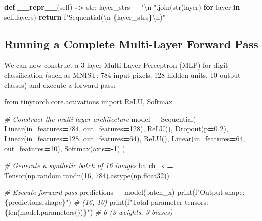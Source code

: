 \documentclass[
  letterpaper,
]{scrbook}
\newenvironment{Shaded}{\begin{snugshade}}{\end{snugshade}}
\newcommand{\BuiltInTok}[1]{#1}
\newcommand{\CharTok}[1]{\textcolor[rgb]{0.31,0.60,0.02}{#1}}
\newcommand{\CommentTok}[1]{\textcolor[rgb]{0.56,0.35,0.01}{\textit{#1}}}
\newcommand{\ControlFlowTok}[1]{\textcolor[rgb]{0.13,0.29,0.53}{\textbf{#1}}}
\newcommand{\DecValTok}[1]{\textcolor[rgb]{0.00,0.00,0.81}{#1}}
\newcommand{\FloatTok}[1]{\textcolor[rgb]{0.00,0.00,0.81}{#1}}
\newcommand{\FunctionTok}[1]{\textcolor[rgb]{0.13,0.29,0.53}{\textbf{#1}}}
\newcommand{\ImportTok}[1]{#1}
\newcommand{\KeywordTok}[1]{\textcolor[rgb]{0.13,0.29,0.53}{\textbf{#1}}}
\newcommand{\NormalTok}[1]{#1}
\newcommand{\OperatorTok}[1]{\textcolor[rgb]{0.81,0.36,0.00}{\textbf{#1}}}
\newcommand{\SpecialCharTok}[1]{\textcolor[rgb]{0.81,0.36,0.00}{\textbf{#1}}}
\newcommand{\SpecialStringTok}[1]{\textcolor[rgb]{0.31,0.60,0.02}{#1}}
\newcommand{\StringTok}[1]{\textcolor[rgb]{0.31,0.60,0.02}{#1}}
\newcommand{\VariableTok}[1]{\textcolor[rgb]{0.00,0.00,0.00}{#1}}
\begin{document}
\begin{Shaded}
\begin{Highlighting}[]
    \KeywordTok{def} \FunctionTok{\_\_repr\_\_}\NormalTok{(}\VariableTok{self}\NormalTok{) }\OperatorTok{{-}\textgreater{}} \BuiltInTok{str}\NormalTok{:}
\NormalTok{        layer\_strs }\OperatorTok{=} \StringTok{"}\CharTok{\textbackslash{}n}\StringTok{  "}\NormalTok{.join(}\BuiltInTok{str}\NormalTok{(layer) }\ControlFlowTok{for}\NormalTok{ layer }\KeywordTok{in} \VariableTok{self}\NormalTok{.layers)}
        \ControlFlowTok{return} \SpecialStringTok{f"Sequential(}\CharTok{\textbackslash{}n}\SpecialStringTok{  }\SpecialCharTok{\{}\NormalTok{layer\_strs}\SpecialCharTok{\}}\CharTok{\textbackslash{}n}\SpecialStringTok{)"}
\end{Highlighting}
\end{Shaded}

\subsection{Running a Complete Multi-Layer Forward
Pass}\label{running-a-complete-multi-layer-forward-pass}

We can now construct a 3-layer Multi-Layer Perceptron (MLP) for digit
classification (such as MNIST: 784 input pixels, 128 hidden units, 10
output classes) and execute a forward pass:

\begin{Shaded}
\begin{Highlighting}[]
\ImportTok{from}\NormalTok{ tinytorch.core.activations }\ImportTok{import}\NormalTok{ ReLU, Softmax}

\CommentTok{\# Construct the multi{-}layer architecture}
\NormalTok{model }\OperatorTok{=}\NormalTok{ Sequential(}
\NormalTok{    Linear(in\_features}\OperatorTok{=}\DecValTok{784}\NormalTok{, out\_features}\OperatorTok{=}\DecValTok{128}\NormalTok{),}
\NormalTok{    ReLU(),}
\NormalTok{    Dropout(p}\OperatorTok{=}\FloatTok{0.2}\NormalTok{),}
\NormalTok{    Linear(in\_features}\OperatorTok{=}\DecValTok{128}\NormalTok{, out\_features}\OperatorTok{=}\DecValTok{64}\NormalTok{),}
\NormalTok{    ReLU(),}
\NormalTok{    Linear(in\_features}\OperatorTok{=}\DecValTok{64}\NormalTok{, out\_features}\OperatorTok{=}\DecValTok{10}\NormalTok{),}
\NormalTok{    Softmax(axis}\OperatorTok{={-}}\DecValTok{1}\NormalTok{)}
\NormalTok{)}

\CommentTok{\# Generate a synthetic batch of 16 images}
\NormalTok{batch\_x }\OperatorTok{=}\NormalTok{ Tensor(np.random.randn(}\DecValTok{16}\NormalTok{, }\DecValTok{784}\NormalTok{).astype(np.float32))}

\CommentTok{\# Execute forward pass}
\NormalTok{predictions }\OperatorTok{=}\NormalTok{ model(batch\_x)}
\BuiltInTok{print}\NormalTok{(}\SpecialStringTok{f"Output shape: }\SpecialCharTok{\{}\NormalTok{predictions}\SpecialCharTok{.}\NormalTok{shape}\SpecialCharTok{\}}\SpecialStringTok{"}\NormalTok{)  }\CommentTok{\# (16, 10)}
\BuiltInTok{print}\NormalTok{(}\SpecialStringTok{f"Total parameter tensors: }\SpecialCharTok{\{}\BuiltInTok{len}\NormalTok{(model.parameters())}\SpecialCharTok{\}}\SpecialStringTok{"}\NormalTok{)  }\CommentTok{\# 6 (3 weights, 3 biases)}
\end{Highlighting}
\end{Shaded}
\end{document}
